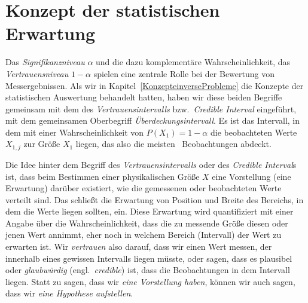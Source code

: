 
\section{Konzept der statistischen Erwartung}

Das \textsl{Signifikanzniveau} $\alpha$ und die dazu komplementäre Wahrscheinlichkeit,
das \textsl{Vertrauensniveau} $1 - \alpha$ spielen eine zentrale Rolle bei der Bewertung
von Messergebnissen. Als wir in Kapitel~\ref{KonzepteinverseProbleme} die Konzepte der statistischen Auswertung
behandelt hatten,
haben wir diese beiden Begriffe gemeinsam mit dem des \textsl{Vertrauensintervalls} bzw.\
\textsl{Credible Interval} eingeführt, mit dem gemeinsamen Oberbegriff \textsl{Überdeckungsintervall}.
Es ist das Intervall, in dem mit einer Wahrscheinlichkeit von $P(X_1) = 1 - \alpha$ die
beobachteten Werte $X_{1,j}$ zur Größe $X_1$ liegen, das also die \glqq meisten\grqq
~Beobachtungen abdeckt.

Die Idee hinter dem Begriff des \textsl{Vertrauensintervalls} oder des \textsl{Credible Interval}s
ist, dass beim Bestimmen einer physikalischen Größe $X$ eine Vorstellung (eine Erwartung) darüber
existiert, wie die gemessenen oder beobachteten Werte verteilt sind. Das schließt die
Erwartung von Position und Breite des Bereichs, in dem die Werte liegen sollten, ein.
Diese Erwartung wird quantifiziert mit einer Angabe über die Wahrscheinlichkeit, dass die
zu messende Größe diesen oder jenen Wert annimmt, eher noch in welchem Bereich (Intervall) der
Wert zu erwarten ist. Wir \textsl{vertrauen} also darauf, dass wir einen Wert messen, der innerhalb eines
gewissen Intervalls liegen müsste, oder sagen, dass es plausibel oder \textsl{glaubwürdig}
(engl.\ \textsl{credible}) ist, dass die Beobachtungen in dem Intervall liegen.
Statt zu sagen, dass wir \textsl{eine Vorstellung haben}, können wir auch sagen,
dass wir \textsl{eine Hypothese aufstellen}.

